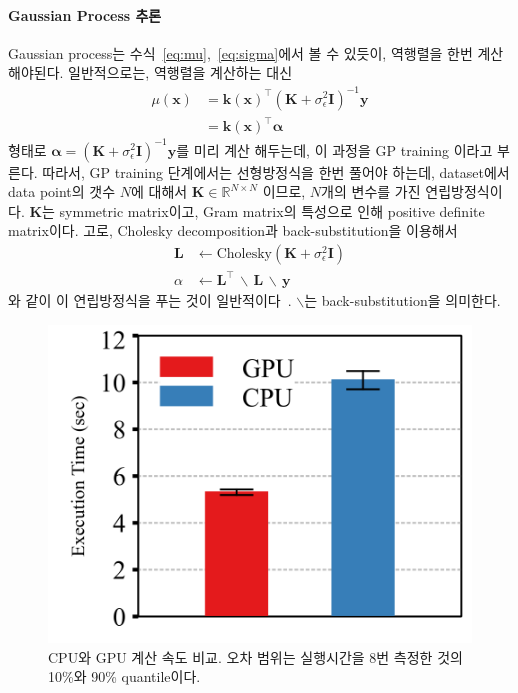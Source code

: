 \documentclass[ba, 11pt]{imsart}
\newcommand{\vk}{\mathbf{k}}
\newcommand{\vx}{\mathbf{x}}
\newcommand{\vy}{\mathbf{y}}
\newcommand{\valpha}{\pmb{\alpha}}
\newcommand{\mI}{\mathbf{I}}
\newcommand{\mK}{\mathbf{K}}
\newcommand{\mL}{\mathbf{L}}
\begin{document}
\paragraph{Gaussian Process 추론}
Gaussian process는 수식~\eqref{eq:mu},~\eqref{eq:sigma}에서 볼 수 있듯이, 역행렬을 한번 계산해야된다.
일반적으로는, 역행렬을 계산하는 대신 
\begin{align}
  \mu(\vx) &= {\vk(\vx)}^{\top } {(\mK + \sigma^2_{\epsilon} \mI)}^{-1} \vy \\
  &= {\vk(\vx)}^{\top } \valpha
\end{align}
형태로 \( \valpha = {(\mK + \sigma^2_{\epsilon} \mI)}^{-1} \vy \)를 미리 계산 해두는데, 이 과정을 GP training 이라고 부른다.
따라서, GP training 단계에서는 선형방정식을 한번 풀어야 하는데, dataset에서 data point의 갯수 \(N\)에 대해서 \(\mK \in \mathbb{R}^{N \times N}\) 이므로, \(N\)개의 변수를 가진 연립방정식이다.
\(\mK\)는 symmetric matrix이고, Gram matrix의 특성으로 인해 positive definite matrix이다.
고로, Cholesky decomposition과 back-substitution을 이용해서
\begin{align}
  \mL    &\leftarrow \text{Cholesky}(\mK + \sigma^2_{\epsilon} \mI) \\
  \alpha &\leftarrow \mL^\top \, \backslash \, \mL  \, \backslash \, \vy \label{eq:alpha}
\end{align}
와 같이 이 연립방정식을 푸는 것이 일반적이다~\citep{rasmussen_gaussian_2006}.
\(\backslash\)는 back-substitution을 의미한다.

\begin{figure}[t]
  \centering
  \includegraphics[scale=0.7]{figures/exectime_01.png}
  \caption{CPU와 GPU 계산 속도 비교.
    오차 범위는 실행시간을 8번 측정한 것의 10\%와 90\% quantile이다.}\label{fig:exec_time}
\end{figure}
%
\end{document}
